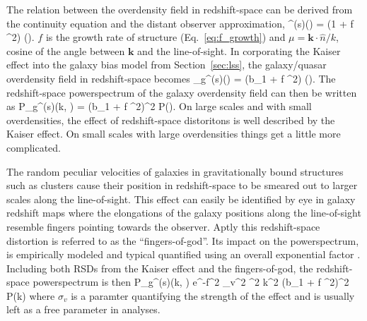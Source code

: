 The relation between the overdensity field in redshift-space can be 
derived from the continuity equation and the distant observer approximation, 
\beq
\delta^{(s)}() = (1 + f \mu^2) \delta().
\eeq
$f$ is the growth rate of structure (Eq.~\ref{eq:f_growth}) and 
$\mu = \bm{k} \cdot \hat{n} / k$, cosine of the angle between $\bm{k}$ and 
the line-of-sight. In corporating the Kaiser effect into the galaxy bias model 
from Section~\ref{sec:lss}, the galaxy/quasar overdensity field in 
redshift-space becomes
\beq
\delta_g^{(s)}() = (b_1 + f \mu^2) \delta().
\eeq
The redshift-space powerspectrum of the galaxy overdensity field can then be
written as 
\beq
P_g^{(s)}(k, \mu) = (b_1 + f \mu^2)^2 P().
\eeq
On large scales and with small overdensities, the effect of redshift-space 
distoritons is well described by the Kaiser effect. On small scales with large
overdensities things get a little more complicated. 

The random peculiar velocities of galaxies in gravitationally bound structures 
such as clusters cause their position in redshift-space to be smeared out to 
larger scales along the line-of-sight. This effect can easily be identified by 
eye in galaxy redshift maps where the elongations of the galaxy positions along the 
line-of-sight resemble fingers pointing towards the observer. Aptly this 
redshift-space distortion is referred to as the ``fingers-of-god''. Its impact on the 
powerspectrum, is empirically modeled and typical quantified using an overall exponential 
factor \citep[][]{Jackson:1972aa,Scoccimarro:2004aa,Taruya:2010aa,Beutler:2016aa}. 
Including both RSDs from the Kaiser effect and the fingers-of-god, the 
redshift-space powerspectrum is then 
\beq \label{eq:pk_rsd}
P_g^{(s)}(k, \mu) \approx e^{-f^2 \sigma_v^2 \mu^2 k^2} (b_1 + f \mu^2)^2 P(k)
\eeq
where $\sigma_v$ is a paramter quantifying the strength of the effect and is usually
left as a free parameter in analyses. 

